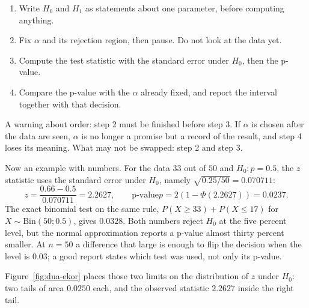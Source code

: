 \begin{resep}
\begin{enumerate}
  \item Write $H_0$ and $H_1$ as statements about one parameter, before
        computing anything.
  \item Fix $\alpha$ and its rejection region, then pause. Do not look at
        the data yet.
  \item Compute the test statistic with the standard error under $H_0$, then the p-value.
  \item Compare the p-value with the $\alpha$ already fixed, and report the
        interval together with that decision.
\end{enumerate}
A warning about order: step 2 must be finished before step 3. If $\alpha$ is chosen
after the data are seen, $\alpha$ is no longer a promise but a record of the result, and step 4
loses its meaning. What may not be swapped: step 2 and step 3.
\end{resep}

Now an example with numbers. For the data $33$ out of $50$ and $H_0\colon p=0.5$,
the $z$ statistic uses the standard error under $H_0$, namely $\sqrt{0.25/50}=0.070711$:
\[
z=\frac{0.66-0.5}{0.070711}=2.2627,\qquad
\text{p-value} p=2(1-\Phi(2.2627))=0.0237 .
\]
The exact binomial test on the same rule, $P(X\ge33)+P(X\le17)$ for
$X\sim\mathrm{Bin}(50;0.5)$, gives $0.0328$. Both numbers reject $H_0$ at the five percent
level, but the normal approximation reports a p-value almost thirty percent smaller. At $n=50$
a difference that large is enough to flip the decision when the level is $0.03$; a good
report states which test was used, not only its p-value.

Figure~\ref{fig:dua-ekor} places those two limits on the distribution of $z$ under $H_0$: two
tails of area $0.0250$ each, and the observed statistic $2.2627$ inside the right tail.

